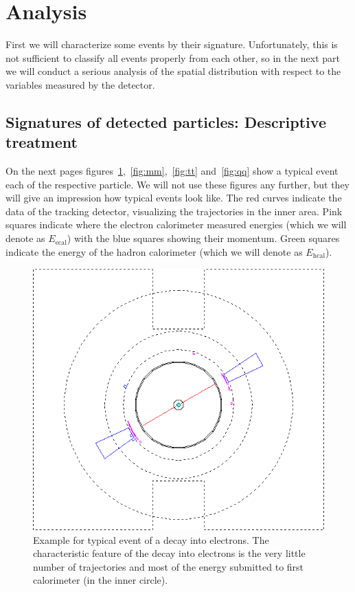 \section{Analysis}
First we will characterize some events by their signature. Unfortunately, this is not sufficient to classify all events
properly from each other, so in the next part we will conduct a serious analysis of the spatial distribution with respect to
the variables measured by the detector. 
\subsection{Signatures of detected particles: Descriptive treatment}
On the next pages figures~\ref{fig:ee},~\ref{fig:mm},~\ref{fig:tt} and~\ref{fig:qq} show
a typical event each of the respective particle. We will not use these figures any
further, but they will give an impression how typical events look like.
The red curves indicate the data of the tracking detector, visualizing the trajectories
in the inner area. Pink squares indicate where the electron calorimeter measured energies
(which we will denote as $E_{\mathrm{ecal}}$)
with the blue squares showing their momentum. Green squares indicate the energy of the
hadron calorimeter (which we will denote as $E_{\mathrm{hcal}}$).

\begin{figure}[htpb]
    \centering
    \includegraphics[width=0.8\linewidth]{figures/ee_02.png}
    \caption{Example for typical event of a decay into electrons. The characteristic feature of the decay into electrons is
    the very little number of trajectories and most of the energy submitted to first calorimeter (in the inner circle).}
\label{fig:ee}
\end{figure}

